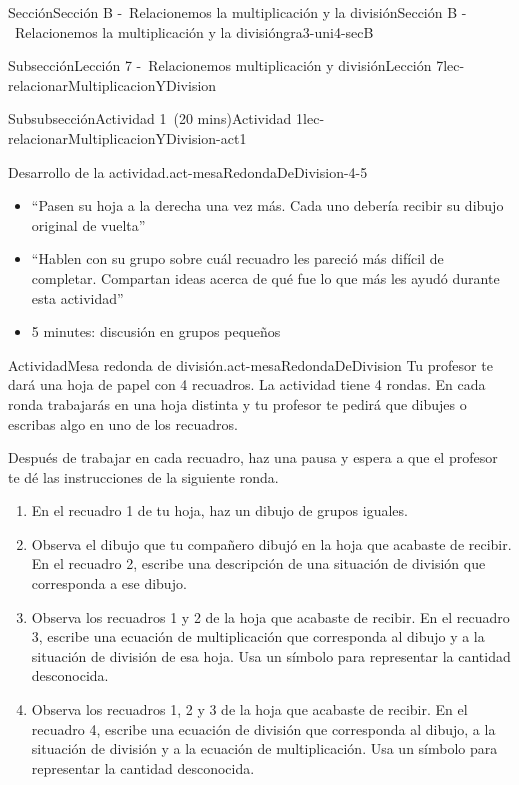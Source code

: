\documentclass[oneside,10pt,]{article}
\begin{document}
\begin{sectionptx}{Sección}{Sección B -~Relacionemos la multiplicación y la división}{}{Sección B -~Relacionemos la multiplicación y la división}{}{}{gra3-uni4-secB}
\begin{subsectionptx}{Subsección}{Lección 7 -~Relacionemos multiplicación y división}{}{Lección 7}{}{}{lec-relacionarMultiplicacionYDivision}
\begin{subsubsectionptx}{Subsubsección}{Actividad 1~(20 mins)}{}{Actividad 1}{}{}{lec-relacionarMultiplicacionYDivision-act1}
\begin{paragraphs}{Desarrollo de la actividad.}{act-mesaRedondaDeDivision-4-5}
\begin{itemize}[label=\textbullet]
\item{}``Pasen su hoja a la derecha una vez más. Cada uno debería recibir su dibujo original de vuelta''%
\item{}``Hablen con su grupo sobre cuál recuadro les pareció más difícil de completar. Compartan ideas acerca de qué fue lo que más les ayudó durante esta actividad''%
\item{}5 minutes: discusión en grupos pequeños%
\end{itemize}
\end{paragraphs}%
\begin{activity}{Actividad}{Mesa redonda de división.}{act-mesaRedondaDeDivision}%
Tu profesor te dará una hoja de papel con 4 recuadros. La actividad tiene 4 rondas. En cada ronda trabajarás en una hoja distinta y tu profesor te pedirá que dibujes o escribas algo en uno de los recuadros.%
\par
Después de trabajar en cada recuadro, haz una pausa y espera a que el profesor te dé las instrucciones de la siguiente ronda.%
%
\begin{enumerate}
\item{}En el recuadro 1 de tu hoja, haz un dibujo de grupos iguales.%
\item{}Observa el dibujo que tu compañero dibujó en la hoja que acabaste de recibir. En el recuadro 2, escribe una descripción de una situación de división que corresponda a ese dibujo.%
\item{}Observa los recuadros 1 y 2 de la hoja que acabaste de recibir. En el recuadro 3, escribe una ecuación de multiplicación que corresponda al dibujo y a la situación de división de esa hoja. Usa un símbolo para representar la cantidad desconocida.%
\item{}Observa los recuadros 1, 2 y 3 de la hoja que acabaste de recibir. En el recuadro 4, escribe una ecuación de división que corresponda al dibujo, a la situación de división y a la ecuación de multiplicación. Usa un símbolo para representar la cantidad desconocida.%
\end{enumerate}
\begin{image}{0.2}{0.6}{0.2}{}%

\end{image}
\end{activity}
\end{subsubsectionptx}
\end{subsectionptx}
\end{sectionptx}
\end{document}
